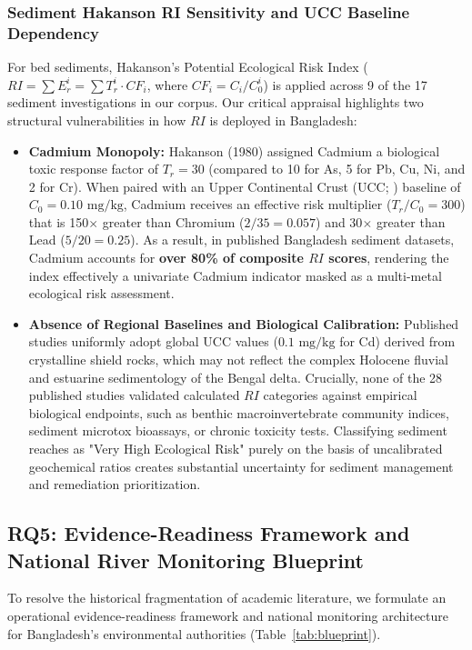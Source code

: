 \documentclass[authoryear,preprint,12pt]{elsarticle}
\begin{document}
\subsubsection{Sediment Hakanson RI Sensitivity and UCC Baseline Dependency}
For bed sediments, Hakanson's Potential Ecological Risk Index ($RI = \sum E_r^i = \sum T_r^i \cdot CF_i$, where $CF_i = C_i/C_0^i$) is applied across 9 of the 17 sediment investigations in our corpus. Our critical appraisal highlights two structural vulnerabilities in how $RI$ is deployed in Bangladesh:
\begin{itemize}
    \item \textbf{Cadmium Monopoly:} Hakanson (1980) assigned Cadmium a biological toxic response factor of $T_r = 30$ (compared to 10 for As, 5 for Pb, Cu, Ni, and 2 for Cr). When paired with an Upper Continental Crust (UCC; \citealp{Wedepohl1995}) baseline of $C_0 = 0.10\text{ mg/kg}$, Cadmium receives an effective risk multiplier ($T_r/C_0 = 300$) that is 150$\times$ greater than Chromium ($2/35 = 0.057$) and 30$\times$ greater than Lead ($5/20 = 0.25$). As a result, in published Bangladesh sediment datasets, Cadmium accounts for \textbf{over 80\% of composite $RI$ scores}, rendering the index effectively a univariate Cadmium indicator masked as a multi-metal ecological risk assessment.
    \item \textbf{Absence of Regional Baselines and Biological Calibration:} Published studies uniformly adopt global UCC values ($0.1\text{ mg/kg}$ for Cd) derived from crystalline shield rocks, which may not reflect the complex Holocene fluvial and estuarine sedimentology of the Bengal delta. Crucially, none of the 28 published studies validated calculated $RI$ categories against empirical biological endpoints, such as benthic macroinvertebrate community indices, sediment microtox bioassays, or chronic toxicity tests. Classifying sediment reaches as "Very High Ecological Risk" purely on the basis of uncalibrated geochemical ratios creates substantial uncertainty for sediment management and remediation prioritization.
\end{itemize}

\subsection{RQ5: Evidence-Readiness Framework and National River Monitoring Blueprint}
To resolve the historical fragmentation of academic literature, we formulate an operational evidence-readiness framework and national monitoring architecture for Bangladesh's environmental authorities (Table~\ref{tab:blueprint}).
\end{document}
